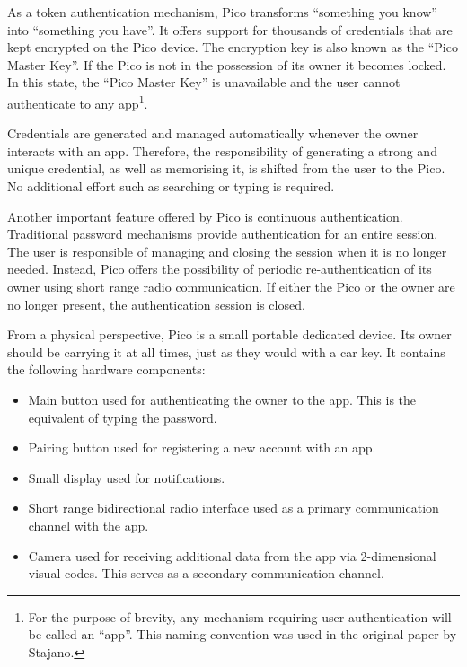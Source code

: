 As a token authentication mechanism, Pico transforms ``something you know'' into ``something you have''. It offers support for thousands of credentials that are kept encrypted on the Pico device. The encryption key is also known as the ``Pico Master Key''. If the Pico is not in the possession of its owner it becomes locked. In this state, the ``Pico Master Key'' is unavailable and the user cannot authenticate to any app\footnote{For the purpose of brevity, any mechanism requiring user authentication will be called an ``app''. This naming convention was used in the original paper by Stajano.}.

Credentials are generated and managed automatically whenever the owner interacts with an app. Therefore, the responsibility of generating a strong and unique credential, as well as memorising it, is shifted from the user to the Pico. No additional effort such as searching or typing is required.

Another important feature offered by Pico is continuous authentication. Traditional password mechanisms provide authentication for an entire session. The user is responsible of managing and closing the session when it is no longer needed. Instead, Pico offers the possibility of periodic re-authentication of its owner using short range radio communication. If either the Pico or the owner are no longer present, the authentication session is closed. 

From a physical perspective, Pico is a small portable dedicated device. Its owner should be carrying it at all times, just as they would with a car key. It contains the following hardware components:
\begin{itemize}
	\item Main button used for authenticating the owner to the app. This is the equivalent of typing the password.
	\item Pairing button used for registering a new account with an app.
	\item Small display used for notifications.
	\item Short range bidirectional radio interface used as a primary communication channel with the app.
	\item Camera used for receiving additional data from the app via 2-dimensional visual codes. This serves as a secondary communication channel.
\end{itemize}

